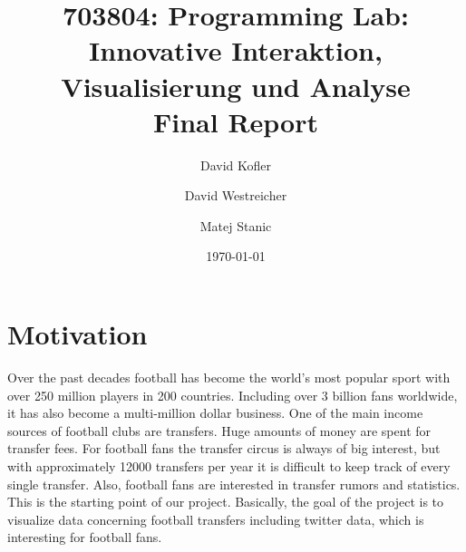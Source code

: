 \documentclass{article}
\begin{document}
\title{703804: Programming Lab: Innovative Interaktion,
Visualisierung und Analyse\\ Final Report}
\author{David Kofler \and David Westreicher \and Matej Stanic}
\date{\today}
\maketitle

\section{Motivation}
Over the past decades football has become the world's most popular sport with over 250 million players in 200 countries. Including over 3 billion fans worldwide, it has also become a multi-million dollar business. One of the main income sources of football clubs are transfers. Huge amounts of money are spent for transfer fees. For football fans the transfer circus is always of big interest, but with approximately 12000 transfers per year it is difficult to keep track of every single transfer. Also, football fans are interested in transfer rumors and statistics. This is the starting point of our project. Basically, the goal of the project is to visualize data concerning football transfers including twitter data, which is interesting for football fans.
\end{document}
